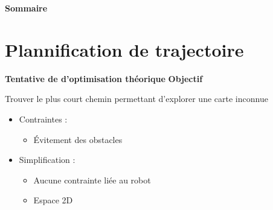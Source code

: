 \documentclass[aspectratio=169,10pt]{beamer}
\begin{document}
\begin{frame}{\textbf{Sommaire}}
    \tableofcontents
\end{frame}




\section{Plannification de trajectoire}

\begin{frame}{\textbf{Tentative de d'optimisation théorique}}
	\textbf{Objectif}
	\vspace{0.5em}
	
	Trouver le plus court chemin permettant d'explorer une carte inconnue
	
	\vspace{0.5em}
	\begin{itemize}
		\item Contraintes :
		\begin{itemize}
			\item Évitement des obstacles
		\end{itemize}
		\vspace{0.2cm}
		\item Simplification :
		\begin{itemize}
			\item Aucune contrainte liée au robot
			\vspace{0.2cm}
			\item Espace 2D
		\end{itemize}
	\end{itemize}
	
\end{frame}
\end{document}
